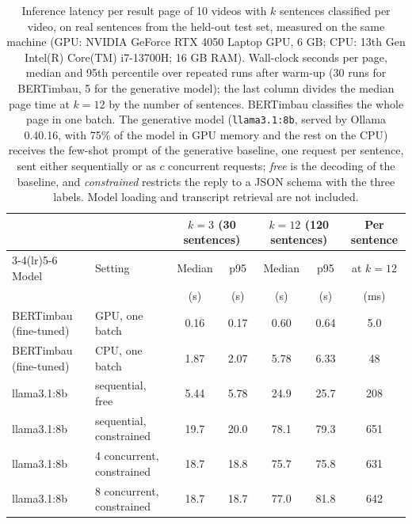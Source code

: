 \begin{table}[!t]
\centering
\caption{Inference latency per result page of 10 videos with $k$ sentences classified per video, on real sentences from the held-out test set, measured on the same machine (GPU: NVIDIA GeForce RTX 4050 Laptop GPU, 6 GB; CPU: 13th Gen Intel(R) Core(TM) i7-13700H; 16 GB RAM). Wall-clock seconds per page, median and 95th percentile over repeated runs after warm-up (30 runs for BERTimbau, 5 for the generative model); the last column divides the median page time at $k = 12$ by the number of sentences. BERTimbau classifies the whole page in one batch. The generative model (\texttt{llama3.1:8b}, served by Ollama 0.40.16, with 75\% of the model in GPU memory and the rest on the CPU) receives the few-shot prompt of the generative baseline, one request per sentence, sent either sequentially or as $c$ concurrent requests; \emph{free} is the decoding of the baseline, and \emph{constrained} restricts the reply to a JSON schema with the three labels. Model loading and transcript retrieval are not included.}
\label{tab:latencia}
\begin{tabular}{llccccc}
\toprule
 &  & \multicolumn{2}{c}{$k = 3$ (30 sentences)} & \multicolumn{2}{c}{$k = 12$ (120 sentences)} & Per sentence \\
\cmidrule(lr){3-4}\cmidrule(lr){5-6}
Model & Setting & Median & p95 & Median & p95 & at $k = 12$ \\
 &  & (s) & (s) & (s) & (s) & (ms) \\
\midrule
BERTimbau (fine-tuned) & GPU, one batch & 0.16 & 0.17 & 0.60 & 0.64 & 5.0 \\
BERTimbau (fine-tuned) & CPU, one batch & 1.87 & 2.07 & 5.78 & 6.33 & 48 \\
llama3.1:8b & sequential, free & 5.44 & 5.78 & 24.9 & 25.7 & 208 \\
llama3.1:8b & sequential, constrained & 19.7 & 20.0 & 78.1 & 79.3 & 651 \\
llama3.1:8b & 4 concurrent, constrained & 18.7 & 18.8 & 75.7 & 75.8 & 631 \\
llama3.1:8b & 8 concurrent, constrained & 18.7 & 18.7 & 77.0 & 81.8 & 642 \\
\bottomrule
\end{tabular}
\end{table}

